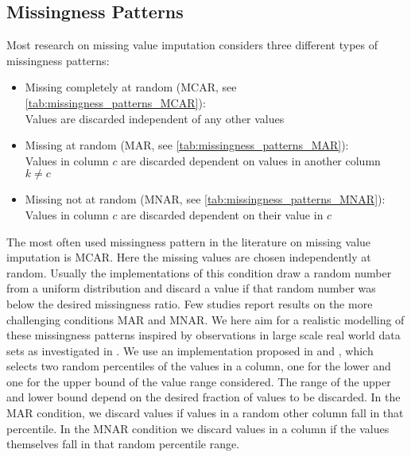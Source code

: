 \subsection{Missingness Patterns}
\label{sec:missingess_pattern}
Most research on missing value imputation considers three different types of missingness patterns:
%
\begin{itemize}
\item Missing completely at random (MCAR, see \autoref{tab:missingness_patterns_MCAR}): \\
Values are discarded independent of any other values
\item Missing at random (MAR, see \autoref{tab:missingness_patterns_MAR}): \\
Values in column $c$ are discarded dependent on values in another column $k\neq c$
\item Missing not at random (MNAR, see \autoref{tab:missingness_patterns_MNAR}): \\
Values in column $c$ are discarded dependent on their value in $c$
\end{itemize}
%
The most often used missingness pattern in the literature on missing value imputation is MCAR. Here the missing values are chosen independently at random. Usually the implementations of this condition draw a random number from a uniform distribution and discard a value if that random number was below the desired missingness ratio. Few studies report results on the more challenging conditions MAR and MNAR. We here aim for a realistic modelling of these missingness patterns inspired by observations in large scale real world data sets as investigated in \cite{Biessmann2018a}. We use an implementation proposed in \cite{Schelter2020a} and \cite{Jenga}, which selects two random percentiles of the values in a column, one for the lower and one for the upper bound of the value range considered. The range of the upper and lower bound depend on the desired fraction of values to be discarded. In the MAR condition, we discard values if values in a random other column fall in that percentile. In the MNAR condition we discard values in a column if the values themselves fall in that random percentile range.
%
